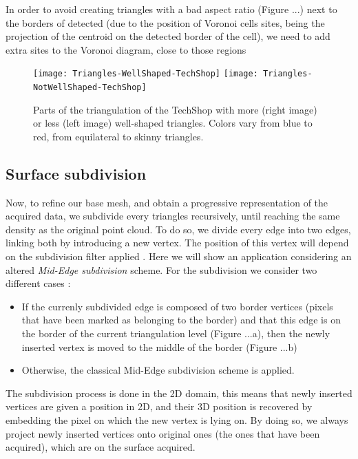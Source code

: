 

In order to avoid creating triangles with a bad aspect ratio (Figure ...) next to the borders of detected (due to the position of Voronoi cells sites, being the projection of the centroid on the detected border of the cell), we need to add extra sites to the Voronoi diagram, close to those regions

\begin{figure}[ht]
\centering\texttt{[image: Triangles-WellShaped-TechShop]}
\centering\texttt{[image: Triangles-NotWellShaped-TechShop]}
\caption{Parts of the triangulation of the TechShop with more (right image) or less (left image) well-shaped triangles. 
Colors vary from blue to red, from equilateral to skinny triangles.}
\label{fig:voronoi_diagram_triangulation}
\end{figure}

\subsection{Surface subdivision}

Now, to refine our base mesh, and obtain a progressive representation of the acquired data, we subdivide every triangles recursively, until reaching the same density as the original point cloud.
To do so, we divide every edge into two edges, linking both by introducing a new vertex. The position of this vertex will depend on the subdivision filter applied \cite{PR08}.
Here we will show an application considering an altered \textit{Mid-Edge subdivision} scheme.
For the subdivision we consider two different cases :
\begin{itemize}
	\item If the currenly subdivided edge is composed of two border vertices (pixels that have been marked as belonging to the border) and that this edge is on the border of the current triangulation level (Figure ...a), then the newly inserted vertex is moved to the middle of the border (Figure ...b)
	\item Otherwise, the classical Mid-Edge subdivision scheme is applied.
\end{itemize}

The subdivision process is done in the 2D domain, this means that newly inserted vertices are given a position in 2D, and their 3D position is recovered by embedding the pixel on which the new vertex is lying on.
By doing so, we always project newly inserted vertices onto original ones (the ones that have been acquired), which are on the surface acquired.

